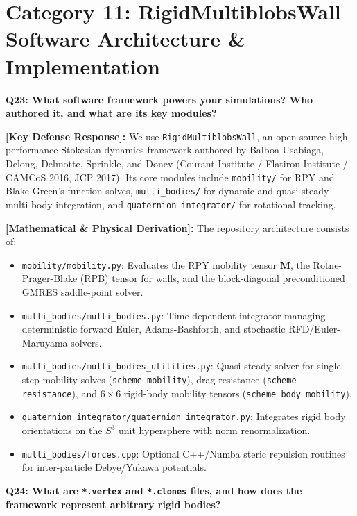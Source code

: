 \documentclass[11pt,a4paper]{article}
\newcommand{\question}[2]{
    \vspace{0.4cm}
    \noindent\colorbox{blue!10}{\parbox{\dimexpr\textwidth-2\fboxsep\relax}{
        \textbf{#1: #2}
    }}
    \vspace{0.2cm}
}
\newcommand{\shortanswer}[1]{
    \noindent\textbf{\textcolor{green!50!black}{[Key Defense Response]:}} #1
    \vspace{0.2cm}
}
\newcommand{\deepdetails}[1]{
    \noindent\textbf{\textcolor{blue!60!black}{[Mathematical \& Physical Derivation]:}} #1
    \vspace{0.2cm}
}
\begin{document}
\section{Category 11: RigidMultiblobsWall Software Architecture \& Implementation}

\question{Q23}{What software framework powers your simulations? Who authored it, and what are its key modules?}

\shortanswer{We use \texttt{RigidMultiblobsWall}, an open-source high-performance Stokesian dynamics framework authored by Balboa Usabiaga, Delong, Delmotte, Sprinkle, and Donev (Courant Institute / Flatiron Institute / CAMCoS 2016, JCP 2017). Its core modules include \texttt{mobility/} for RPY and Blake Green's function solves, \texttt{multi\_bodies/} for dynamic and quasi-steady multi-body integration, and \texttt{quaternion\_integrator/} for rotational tracking.}

\deepdetails{
The repository architecture consists of:
\begin{itemize}
    \item \texttt{mobility/mobility.py}: Evaluates the RPY mobility tensor $\mathbf{M}$, the Rotne-Prager-Blake (RPB) tensor for walls, and the block-diagonal preconditioned GMRES saddle-point solver.
    \item \texttt{multi\_bodies/multi\_bodies.py}: Time-dependent integrator managing deterministic forward Euler, Adams-Bashforth, and stochastic RFD/Euler-Maruyama solvers.
    \item \texttt{multi\_bodies/multi\_bodies\_utilities.py}: Quasi-steady solver for single-step mobility solves (\texttt{scheme mobility}), drag resistance (\texttt{scheme resistance}), and $6 \times 6$ rigid-body mobility tensors (\texttt{scheme body\_mobility}).
    \item \texttt{quaternion\_integrator/quaternion\_integrator.py}: Integrates rigid body orientations on the $S^3$ unit hypersphere with norm renormalization.
    \item \texttt{multi\_bodies/forces.cpp}: Optional C++/Numba steric repulsion routines for inter-particle Debye/Yukawa potentials.
\end{itemize}
}

\vspace{0.4cm}
\question{Q24}{What are \texttt{*.vertex} and \texttt{*.clones} files, and how does the framework represent arbitrary rigid bodies?}
\end{document}
